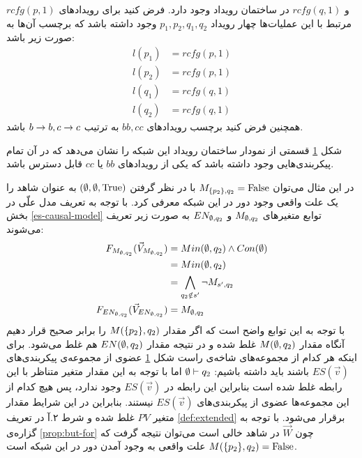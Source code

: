 $rcfg(p,1)$
و
$rcfg(q,1)$
در ساختمان رویداد وجود دارد.
فرض کنید برای رویداد‌های مرتبط با این عملیات‌ها چهار رویداد
$p_1,p_2,q_1,q_2$
وجود داشته باشد که برچسب آن‌ها به صورت زیر باشد:
\begin{align*}
    l(p_1) & = rcfg(p,1) \\
    l(p_2) & = rcfg(p,1) \\
    l(q_1) & = rcfg(q,1) \\
    l(q_2) & = rcfg(q,1)
\end{align*}
همچنین فرض کنید برچسب رویداد‌های
$bb,cc$
به ترتیب
$b\rightarrow b,c\rightarrow c$
باشد.
\begin{figure}
    \centering
    \caption{}
    \label{fig:loop:es}
\end{figure}
شکل
\ref{fig:loop:es}
قسمتی از نمودار ساختمان رویداد این شبکه را نشان می‌دهد که در آن تمام پیکر‌بندی‌هایی وجود داشته باشد که یکی از رویداد‌های
$bb$
یا
$cc$
قابل دسترس باشد.

در این مثال می‌توان
$M_{\{p_2\},q_2}= \mathrm{False}$
با در نظر گرفتن
$(\emptyset,\emptyset,\mathrm{True})$
به عنوان شاهد را یک علت واقعی وجود دور در این شبکه
معرفی کرد.
با توجه به تعریف مدل علّی در بخش
\ref{es-causal-model}
توابع متغیر‌های
$M_{\emptyset,q_2}$
و
$EN_{\emptyset,q_2}$
به صورت زیر تعریف می‌شوند:
\begin{align*}
    F_{M_{\emptyset,q_2}}(\vec V_{M_{\emptyset,q_2}})  & = Min(\emptyset,q_2) \wedge Con(\emptyset) \\
                    & = Min(\emptyset,q_2)                \\
                    & =  \bigwedge_{q_2 \notin s'}
    \neg M_{s',q_2}                                \\
    F_{EN_{\emptyset,q_2}}(\vec V_{EN_{\emptyset,q_2}}) & = M_{\emptyset,q_2}
\end{align*}
با توجه به این توابع واضح است که 
اگر مقدار
$M(\{p_2\},q_2)$
را برابر صحیح قرار دهیم آنگاه مقدار
$M(\emptyset,q_2)$
غلط شده و در نتیجه مقدار
$EN(\emptyset,q_2)$
هم غلط می‌شود.
برای اینکه هر کدام از مجموعه‌های شاخه‌ی راست شکل
\ref{fig:loop:es}
عضوی از مجموعه‌ی پیکربندی‌های 
$ES(\vec v)$
باشند باید داشته باشیم:
$\emptyset \vdash q_2$
اما با توجه به این مقدار متغیر متناظر با این رابطه غلط شده است بنابراین این رابطه در 
$ES(\vec v)$
وجود ندارد، پس هیچ کدام از این مجموعه‌ها عضوی از پیکربندی‌های 
$ES(\vec v)$
نیستند.
بنابراین در این شرایط مقدار متغیر 
$PV$
غلط شده و شرط ۲.آ در تعریف 
\ref{def:extended}
برقرار می‌شود.
با توجه به گزاره‌ی 
\ref{prop:but-for}
چون
$\vec W$
در شاهد خالی است می‌توان نتیجه گرفت که
$M(\{p_2\},q_2) = \mathrm{False}$
علت واقعی به وجود آمدن دور در این شبکه است.
